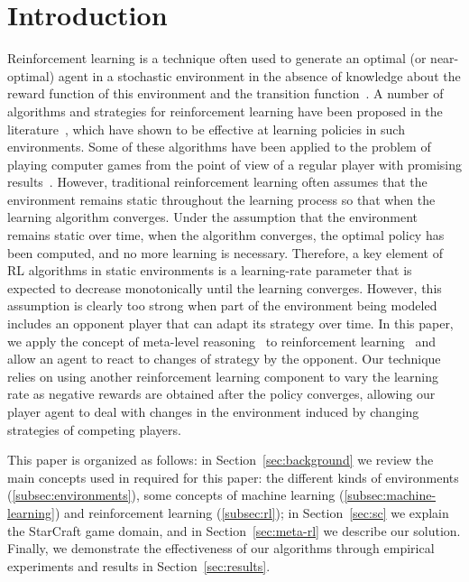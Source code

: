 \section{Introduction}
\label{sec:introduction}

Reinforcement learning is a technique often used to generate an optimal (or near-optimal) agent in a stochastic environment in the absence of knowledge about the reward function of this environment and the transition function~\cite{kaelbling1996reinforcement}. 
A number of algorithms and strategies for reinforcement learning have been proposed in the literature~\cite{stone2005reinforcement,graepel2004learningfight}, which have shown to be effective at learning policies in such environments. 
Some of these algorithms have been applied to the problem of playing computer games from the point of view of a regular player with promising results~\cite{taylor2011teachingmario,mohan2010ralationalmario}. 
However, traditional reinforcement learning often assumes that the environment remains static throughout the learning process so that when the learning algorithm converges. 
Under the assumption that the environment remains static over time, when the algorithm converges, the optimal policy has been computed, and no more learning is necessary. 
Therefore, a key element of RL algorithms in static environments is a learning-rate parameter that is expected to decrease monotonically until the learning converges. 
However, this assumption is clearly too strong when part of the environment being modeled includes an opponent player that can adapt its strategy over time. 
In this paper, we apply the concept of meta-level reasoning~\cite{cox2007metareasoning,ulam2008combining} to reinforcement learning~\cite{schweighofer2003meta} and allow an agent to react to changes of strategy by the opponent.
Our technique relies on using another reinforcement learning component to vary the learning rate as negative rewards are obtained after the policy converges, allowing our player agent to deal with changes in the environment induced by changing strategies of competing players.

This paper is organized as follows: in Section~\ref{sec:background} we review the main concepts used in required for this paper:
the different kinds of environments (\ref{subsec:environments}), 
some concepts of machine learning (\ref{subsec:machine-learning}) and
reinforcement learning (\ref{subsec:rl}); in Section~\ref{sec:sc} we explain the StarCraft game domain, 
and in Section~\ref{sec:meta-rl} we describe our solution.
Finally, we demonstrate the effectiveness of our algorithms through empirical experiments and results in Section~\ref{sec:results}.